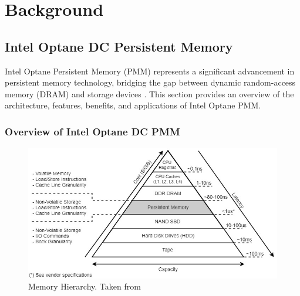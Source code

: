


\chapter[Background]{Background}

\section{Intel Optane DC Persistent Memory}

Intel Optane Persistent Memory (PMM) represents a significant advancement in persistent memory technology, bridging the gap between dynamic random-access memory (DRAM) and storage devices \cite{scargall2020pmem}. This section provides an overview of the architecture, features, benefits, and applications of Intel Optane PMM.

\subsection{Overview of Intel Optane DC PMM}

\begin{figure}[ht]
    \centering
    \includegraphics[scale=0.6]{images/pmem_storage_pyramid.jpg}
    \caption{Memory Hierarchy. Taken from \cite{Introduc86:online}}
    \label{fig:pmem_storage_pyramid}
\end{figure}

